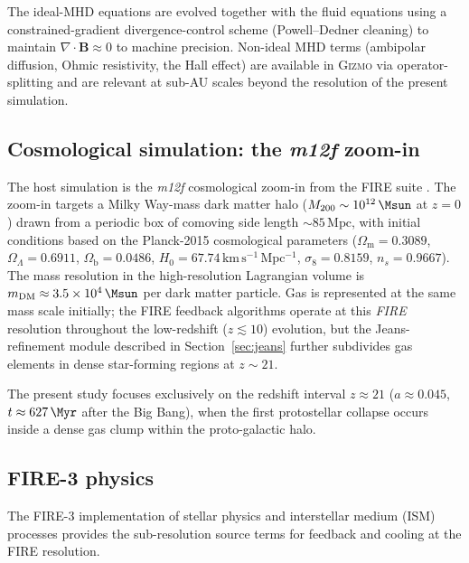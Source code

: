 The ideal-MHD equations are evolved together with the fluid equations using
a constrained-gradient divergence-control scheme
(Powell--Dedner cleaning) to maintain $\nabla\cdot\mathbf{B}\approx 0$ to
machine precision.  Non-ideal MHD terms (ambipolar diffusion, Ohmic
resistivity, the Hall effect) are available in \textsc{Gizmo} via
operator-splitting and are relevant at sub-AU scales beyond the resolution
of the present simulation.

\subsection{Cosmological simulation: the \textit{m12f} zoom-in}
\label{sec:m12f}

The host simulation is the \textit{m12f} cosmological zoom-in from the FIRE
suite \citep{Hopkins2022,Wetzel2023}.  The zoom-in targets a Milky
Way-mass dark matter halo ($M_{200}\sim 10^{12}\,\Msun$ at $z=0$) drawn
from a periodic box of comoving side length $\sim\!85\,\mathrm{Mpc}$, with
initial conditions based on the Planck-2015 cosmological parameters
($\Omega_\mathrm{m}=0.3089$, $\Omega_\Lambda=0.6911$,
$\Omega_\mathrm{b}=0.0486$, $H_0 = 67.74\,\mathrm{km\,s^{-1}\,Mpc^{-1}}$,
$\sigma_8=0.8159$, $n_s = 0.9667$).
The mass resolution in the high-resolution Lagrangian volume is
$m_\mathrm{DM}\approx 3.5\times10^4\,\Msun$ per dark matter particle.
Gas is represented at the same mass scale initially; the FIRE feedback
algorithms operate at this \textit{FIRE} resolution throughout the low-redshift
($z\lesssim 10$) evolution, but the Jeans-refinement module described in
Section~\ref{sec:jeans} further subdivides gas elements in dense star-forming
regions at $z\sim 21$.

The present study focuses exclusively on the redshift interval
$z\approx 21$ ($a\approx 0.045$, $t\approx 627\,\Myr$ after the Big Bang),
when the first protostellar collapse occurs inside a dense gas clump within
the proto-galactic halo.

\subsection{FIRE-3 physics}
\label{sec:fire3}

The FIRE-3 implementation of stellar physics and interstellar medium (ISM)
processes \citep{Hopkins2022} provides the sub-resolution source terms for
feedback and cooling at the FIRE resolution.

